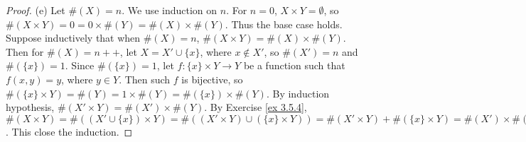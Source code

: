 \begin{proof}{(e)}
Let \(\#(X) = n\).
We use induction on \(n\).
For \(n = 0\), \(X \times Y = \emptyset\), so \(\#(X \times Y) = 0 = 0 \times \#(Y) = \#(X) \times \#(Y)\).
Thus the base case holds.
Suppose inductively that when \(\#(X) = n\), \(\#(X \times Y) = \#(X) \times \#(Y)\).
Then for \(\#(X) = n++\), let \(X = X' \cup \{x\}\), where \(x \notin X'\), so \(\#(X') = n\) and \(\#(\{x\}) = 1\).
Since \(\#(\{x\}) = 1\), let \(f : \{x\} \times Y \to Y\) be a function such that \(f(x, y) = y\), where \(y \in Y\).
Then such \(f\) is bijective, so \(\#(\{x\} \times Y) = \#(Y) = 1 \times \#(Y) = \#(\{x\}) \times \#(Y)\).
By induction hypothesis, \(\#(X' \times Y) = \#(X') \times \#(Y)\).
By Exercise \ref{ex 3.5.4}, \(\#(X \times Y) = \#((X' \cup \{x\}) \times Y) = \#((X' \times Y) \cup (\{x\} \times Y)) = \#(X' \times Y) + \#(\{x\} \times Y) = \#(X') \times \#(Y) + \#(\{x\}) \times \#(Y) = (\#(X') + \#(\{x\})) \times \#(Y) = \#(X) \times \#(Y)\).
This close the induction.
\end{proof}

